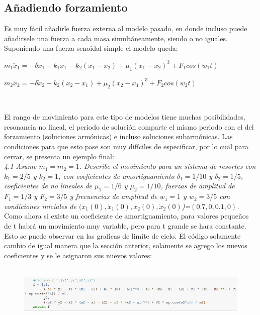 \documentclass[12pt]{article}
\begin{document}
\pagebreak

\subsection{Añadiendo forzamiento}
Es muy fácil añadirle fuerza externa al modelo pasado, en donde incluso puede añadirsele una fuerza a cada masa simultáneamente, siendo o no iguales. Suponiendo una fuerza senoidal simple el modelo queda: \\

\centerline{$m_1 \ddot x_1 = -\delta \dot x_1 -k_1x_1 - k_2(x_1-x_2) + \mu_1 (x_1-x_2)^3 + F_1 cos(w_1t)$}
\centerline{$m_2 \ddot x_2 = -\delta \dot x_2 -k_2(x_2-x_1) + \mu_2 (x_2-x_1)^3 + F_2 cos(w_2t)$}
$    $

El rango de movimiento para este tipo de modelos tiene muchas posibilidades, resonancia no lineal, el periodo de solución comparte el mismo periodo con el del forzamiento (soluciones armónicas) e incluso soluciones subarmónicas.  Las condiciones para que esto pase son muy difíciles de especificar, por lo cual para cerrar, se presenta un ejemplo final: \\ 

\noindent \textit{4.1 Asume $m_1 = m_2 = 1$. Describe el movimiento para un sistema de resortes con $k_1=2/5$ y $k_2=1$, con coeficientes de amortiguamiento $\delta_1=1/10$ y $\delta_2=1/5$, coeficientes de no lineales de $\mu_1=1/6$ y $\mu_2=1/10$, fuerzas de amplitud de $F_1=1/3$ y $F_2=3/5$ y frecuencias de amplitud de $w_1=1$ y $w_2=3/5$ con condiciones iniciales de $(x_1(0), \dot x_1(0), x_2(0), \dot x_2(0)$)=$(0.7,0,0.1,0)$.}\\

Como ahora si existe un coeficiente de amortiguamiento, para valores pequeños de t habrá un movimiento muy variable, pero para t grande se hara constante. Esto se puede observar en las graficas de limite de ciclo. El código solamente cambio de igual manera que la sección anterior, solamente se agrego los nuevos coeficientes y se le asignaron sus nuevos valores: \\ \\

\begin{figure}[h!]
    \centering
\includegraphics[width=6in]{Cod10.png}
\end{figure}
\end{document}
